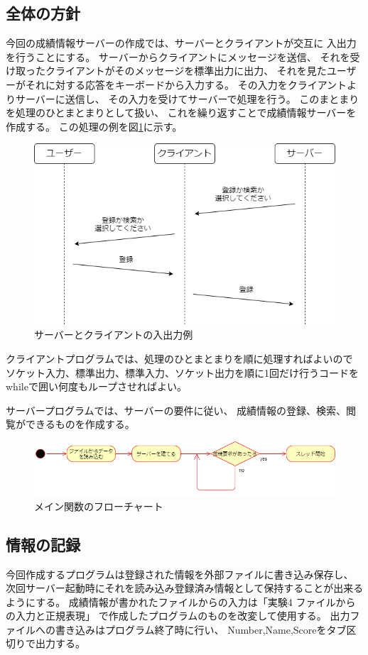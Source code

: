 \documentclass[dvipdfmx]{jsarticle}
\begin{document}
\subsection{全体の方針}
今回の成績情報サーバーの作成では、サーバーとクライアントが交互に
入出力を行うことにする。
サーバーからクライアントにメッセージを送信、
それを受け取ったクライアントがそのメッセージを標準出力に出力、
それを見たユーザーがそれに対する応答をキーボードから入力する。
その入力をクライアントよりサーバーに送信し、
その入力を受けてサーバーで処理を行う。
このまとまりを処理のひとまとまりとして扱い、
これを繰り返すことで成績情報サーバーを作成する。
この処理の例を図\ref{example1}に示す。
\begin{figure}[H]
  \centering
  \includegraphics[width=0.7\hsize]{../pic/1.png}
  \caption{サーバーとクライアントの入出力例}
  \label{example1}
\end{figure}

クライアントプログラムでは、処理のひとまとまりを順に処理すればよいので
ソケット入力、標準出力、標準入力、ソケット出力を順に1回だけ行うコードを
whileで囲い何度もループさせればよい。

サーバープログラムでは、サーバーの要件に従い、
成績情報の登録、検索、閲覧ができるものを作成する。

\begin{figure}[H]
  \centering
  \includegraphics[width=0.9\hsize]{../pic/flowchart1.png}
  \caption{メイン関数のフローチャート}
  \label{fc1}
\end{figure}

\subsection{情報の記録}
今回作成するプログラムは登録された情報を外部ファイルに書き込み保存し、
次回サーバー起動時にそれを読み込み登録済み情報として保持することが出来るようにする。
成績情報が書かれたファイルからの入力は「実験4 ファイルからの入力と正規表現」
で作成したプログラムのものを改変して使用する。
出力ファイルへの書き込みはプログラム終了時に行い、
Number,Name,Scoreをタブ区切りで出力する。
\end{document}
